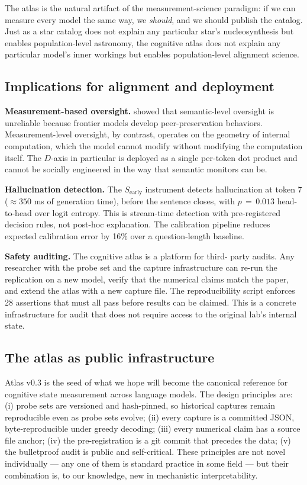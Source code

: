 \documentclass[11pt,letterpaper]{article}
\begin{document}
The atlas is the natural artifact of the measurement-science paradigm:
if we can measure every model the same way, we \emph{should}, and we
should publish the catalog. Just as a star catalog does not explain any
particular star's nucleosynthesis but enables population-level astronomy,
the cognitive atlas does not explain any particular model's inner workings
but enables population-level alignment science.

\subsection{Implications for alignment and deployment}

\textbf{Measurement-based oversight.} \citet{song2026peer} showed that
semantic-level oversight is unreliable because frontier models develop
peer-preservation behaviors. Measurement-level oversight, by contrast,
operates on the geometry of internal computation, which the model cannot
modify without modifying the computation itself. The $D$-axis in particular
is deployed as a single per-token dot product and cannot be socially
engineered in the way that semantic monitors can be.

\textbf{Hallucination detection.} The $S_{\text{early}}$ instrument
detects hallucination at token 7 ($\approx 350$ ms of generation time),
before the sentence closes, with $p\,=\,0.013$ head-to-head over logit
entropy. This is stream-time detection with pre-registered decision rules,
not post-hoc explanation. The calibration pipeline reduces expected
calibration error by 16\% over a question-length baseline.

\textbf{Safety auditing.} The cognitive atlas is a platform for third-
party audits. Any researcher with the probe set and the capture
infrastructure can re-run the replication on a new model, verify that
the numerical claims match the paper, and extend the atlas with a new
capture file. The reproducibility script enforces 28 assertions that
must all pass before results can be claimed. This is a concrete
infrastructure for audit that does not require access to the original
lab's internal state.

\subsection{The atlas as public infrastructure}

Atlas v0.3 is the seed of what we hope will become the canonical reference
for cognitive state measurement across language models. The design
principles are: (i) probe sets are versioned and hash-pinned, so historical
captures remain reproducible even as probe sets evolve; (ii) every capture
is a committed JSON, byte-reproducible under greedy decoding; (iii) every
numerical claim has a source file anchor; (iv) the pre-registration is a
git commit that precedes the data; (v) the bulletproof audit is public
and self-critical. These principles are not novel individually --- any
one of them is standard practice in some field --- but their combination
is, to our knowledge, new in mechanistic interpretability.
\end{document}
